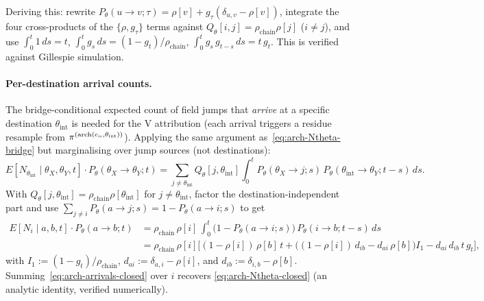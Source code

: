 Deriving this: rewrite $P_\theta(u \to v; \tau) = \rho[v] + g_\tau
(\delta_{u, v} - \rho[v])$, integrate the four cross-products of the
$\{\rho, g_\tau\}$ terms against $Q_\theta[i, j] = \rho_{\text{chain}}
\rho[j]$ ($i \ne j$), and use
$\int_0^t 1\, ds = t$, $\int_0^t g_s\, ds = (1 - g_t)/\rho_{\text{chain}}$,
$\int_0^t g_s\, g_{t-s}\, ds = t\, g_t$. This is verified against
Gillespie simulation.

\paragraph{Per-destination arrival counts.}
The bridge-conditional expected count of field jumps that \emph{arrive}
at a specific destination $\theta_{\text{int}}$ is needed for the V
attribution (each arrival triggers a residue resample from
$\pi^{(\mathrm{arch}(c_n, \theta_{\text{int}}))}$). Applying the same
argument as~\eqref{eq:arch-Ntheta-bridge} but marginalising over jump
sources (not destinations):
\begin{equation}
  E[N_{\theta_{\text{int}}} \mid \theta_X, \theta_Y, t] \cdot P_\theta(\theta_X \to \theta_Y; t)
    = \sum_{j \ne \theta_{\text{int}}} Q_\theta[j, \theta_{\text{int}}]
      \int_0^t P_\theta(\theta_X \to j; s)\,
              P_\theta(\theta_{\text{int}} \to \theta_Y; t{-}s)\, ds.
\end{equation}
With $Q_\theta[j, \theta_{\text{int}}] = \rho_{\text{chain}} \rho[\theta_{\text{int}}]$
for $j \ne \theta_{\text{int}}$, factor the destination-independent part
and use $\sum_{j \ne i} P_\theta(a \to j; s) = 1 - P_\theta(a \to i; s)$
to get
\begin{align}
  E[N_i \mid a, b, t] \cdot P_\theta(a \to b; t)
    &= \rho_{\text{chain}}\, \rho[i]\,
       \int_0^t \big(1 - P_\theta(a \to i; s)\big)\,
              P_\theta(i \to b; t{-}s)\, ds
    \label{eq:arch-arrivals-int} \\
    &= \rho_{\text{chain}}\, \rho[i] \Big[
        (1 - \rho[i])\, \rho[b]\, t
        + \big((1 - \rho[i])\, d_{ib} - d_{ai}\, \rho[b]\big) I_1
        - d_{ai}\, d_{ib}\, t\, g_t \Big],
    \label{eq:arch-arrivals-closed}
\end{align}
with $I_1 := (1 - g_t)/\rho_{\text{chain}}$, $d_{ai} := \delta_{a, i} - \rho[i]$,
and $d_{ib} := \delta_{i, b} - \rho[b]$.
Summing~\eqref{eq:arch-arrivals-closed} over $i$ recovers
\eqref{eq:arch-Ntheta-closed} (an analytic identity, verified
numerically).

